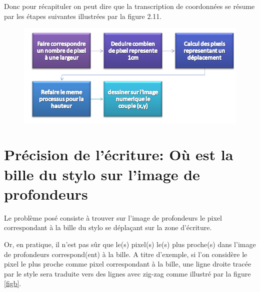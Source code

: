 \documentclass[12pt,a4paper,oneside]{book}
\begin{document}
	Donc pour récapituler on peut dire que la transcription de coordonnées se résume par les étapes suivantes illustrées par la figure 2.11.
	
	\begin{figure}[H]
		\centering
		\includegraphics[scale=0.69]{s3.png}
		\label{fig100}
	\end{figure}
	
	
	\section{Précision de l'écriture: Où est la bille du stylo sur l'image de profondeurs}	
	
	Le problème posé consiste à trouver sur l'image de profondeurs le pixel correspondant à la bille du stylo se déplaçant sur la zone d'écriture.
	
	Or, en pratique, il n'est pas sûr que le(s) pixel(s) le(s) plus proche(s) dans l'image de profondeurs correspond(ent) à la bille.
	A titre d'exemple, si l'on considère le pixel le plus proche comme pixel correspondant à la bille, une ligne droite tracée par le style sera traduite vers des lignes avec zig-zag comme illustré par la figure \ref{figb}.
	
\end{document}
